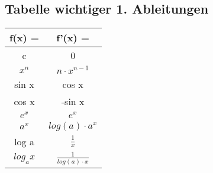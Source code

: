 \documentclass[../mainfile.tex]{subfiles}
\begin{document}
				
	\subsection{Tabelle wichtiger 1. Ableitungen}
		{\centering
		{\large
		\renewcommand{\arraystretch}{1.3}
		\begin{tabular}{c|c}
			f(x) =		&	f'(x) =                     \\ \hline
			c           &	0                           \\ \hline
			$x^n$ 	    &	$n \cdot x^{n-1}$ 			\\ \hline
			sin x       &	cos x                       \\ \hline
			cos x       &	-sin x                      \\ \hline
			$e^x$		&	$e^x$         				\\ \hline
			$a^x$ 		&	$log(a) \cdot a^x$  		\\ \hline
			log a       &	$\frac{1}{x}$               \\ \hline
			$log_a x$   &	$\frac{1}{log(a) \cdot x}$                 
		\end{tabular}\par
		}		
		}
		\renewcommand{\arraystretch}{1.3}
		
\end{document}
